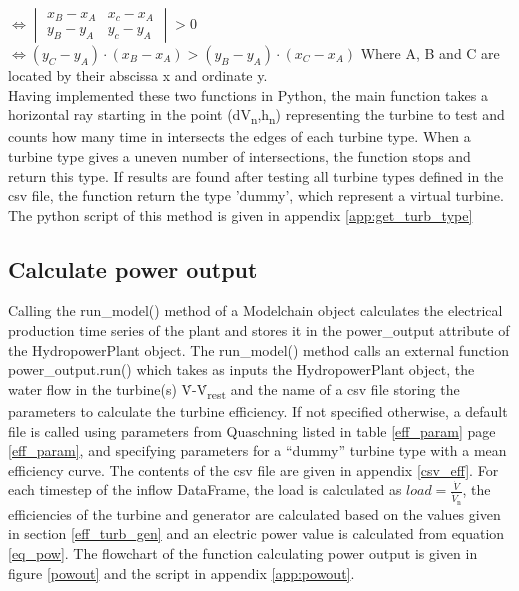 \tabto{2.5cm}$\iff \begin{vmatrix}x_B-x_A&x_c-x_A\\y_B-y_A&y_c-y_A\end{vmatrix}>0$\newline\\
\tabto{2.5cm}$\iff (y_C-y_A)\cdot(x_B-x_A) > (y_B-y_A)\cdot(x_C-x_A)$ \newline
Where A, B and C are located by their abscissa x and ordinate y. \newline
\\
Having implemented these two functions in Python, the main function takes a horizontal ray starting in the point (dV\textsubscript{n},h\textsubscript{n}) representing the turbine to test and counts how many time in intersects the edges of each turbine type. When a turbine type gives a uneven number of intersections, the function stops and return this type. If results are found after testing all turbine types defined in the csv file, the function return the type 'dummy', which represent a virtual turbine. \newline
The python script of this method is given in appendix \ref{app:get_turb_type}


\subsection{Calculate power output}

Calling the run{\_}model() method of a Modelchain object calculates the electrical production time series of the plant and stores it in the power{\_}output attribute of the HydropowerPlant object. The run{\_}model() method calls an external function power{\_}output.run() which takes as inputs the HydropowerPlant object, the water flow in the turbine(s) \.{V}-\.{V}\textsubscript{rest} and the name of a csv file storing the parameters to calculate the turbine efficiency. If not specified otherwise, a default file is called using parameters from Quaschning \cite{quaschning} listed in table \ref{eff_param} page \ref{eff_param}, and specifying parameters for a ``dummy'' turbine type with a mean efficiency curve. The contents of the csv file are given in appendix \ref{csv_eff}. \newline
For each timestep of the inflow DataFrame, the load is calculated as $load = \frac{\dot{V}}{\dot{V}_\mathrm{n}}$, the efficiencies of the turbine and generator are calculated based on the values given in section \ref{eff_turb_gen} and an electric power value is calculated from equation \ref{eq_pow}. The flowchart of the function calculating power output is given in figure \ref{powout} and the script in appendix \ref{app:powout}.

